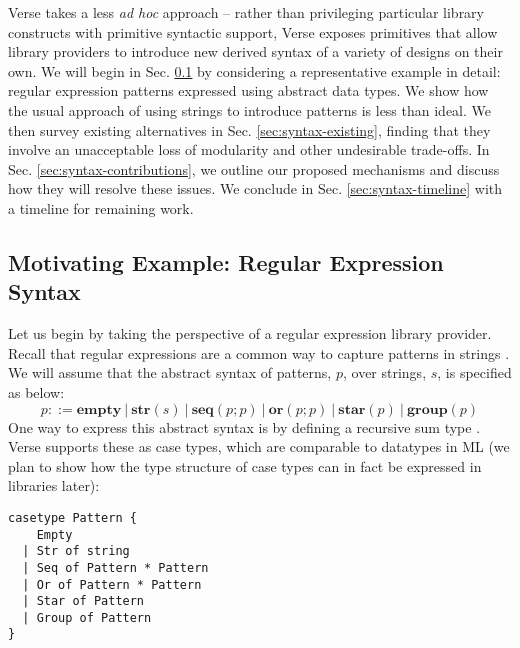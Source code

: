 Verse takes a less \emph{ad hoc} approach -- rather than privileging  particular library constructs with primitive syntactic support, Verse exposes primitives that allow library providers to introduce new derived syntax of a variety of designs on their own. %
We will begin in Sec. \ref{sec:examples} by considering a representative example in detail: regular expression patterns expressed using abstract data types. We show how the usual approach of using strings to introduce patterns is less than ideal. We then survey existing alternatives in Sec. \ref{sec:syntax-existing}, finding that they involve an unacceptable loss of modularity and other undesirable trade-offs. In Sec. \ref{sec:syntax-contributions}, we outline our proposed mechanisms and discuss how they will resolve these issues. We conclude in Sec. \ref{sec:syntax-timeline} with a timeline for remaining work.




\subsection{Motivating Example: Regular Expression Syntax}\label{sec:examples}
Let us begin by taking the perspective of a regular expression library provider. Recall that regular expressions are a common way to capture patterns in strings \cite{Thompson:1968:PTR:363347.363387}. We will assume that the abstract syntax of {patterns}, $p$, over strings, $s$, is specified as below:\[p ::= \textbf{empty} ~|~ \textbf{str}(s) ~|~ \textbf{seq}(p; p) ~|~ \textbf{or}(p; p) ~|~ \textbf{star}(p) ~|~ \textbf{group}(p)\]
One way to express this abstract syntax is by defining a recursive sum type \cite{pfpl}. Verse supports these as case types, which are comparable to datatypes in ML (we plan to show how the type structure  of case types can in fact be expressed in libraries later):

\begin{lstlisting}[numbers=none]
casetype Pattern {
    Empty
  | Str of string
  | Seq of Pattern * Pattern
  | Or of Pattern * Pattern
  | Star of Pattern
  | Group of Pattern
}
\end{lstlisting}

